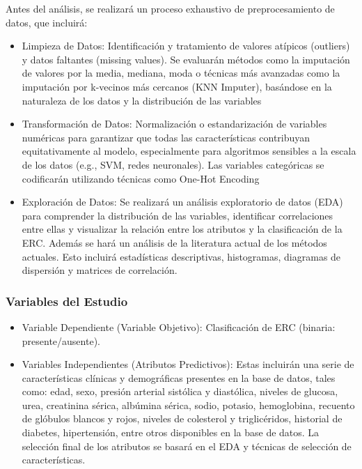 \documentclass{article}
\begin{document}
Antes del análisis, se realizará un proceso exhaustivo de
preprocesamiento de datos, que incluirá:

\begin{itemize}
    \item Limpieza de Datos: Identificación y tratamiento de
        valores atípicos (outliers) y datos faltantes
        (missing values). Se evaluarán métodos como la
        imputación de valores por la media, mediana, moda o
        técnicas más avanzadas como la imputación por
        k-vecinos más cercanos (KNN Imputer), basándose en
        la naturaleza de los datos y la distribución de las
        variables \cite{Garcia2018}
    \item Transformación de Datos: Normalización o
        estandarización de variables numéricas para
        garantizar que todas las características contribuyan
        equitativamente al modelo, especialmente para
        algoritmos sensibles a la escala de los datos (e.g.,
        SVM, redes neuronales). Las variables categóricas se
        codificarán utilizando técnicas como One-Hot
        Encoding \cite{Kuhn2013}
    \item Exploración de Datos: Se realizará un análisis
        exploratorio de datos (EDA) para comprender la
        distribución de las variables, identificar
        correlaciones entre ellas y visualizar la relación
        entre los atributos y la clasificación de la ERC.
        Además se hará un análisis de la literatura actual
        de los métodos actuales.
        Esto incluirá estadísticas descriptivas,
        histogramas, diagramas de dispersión y matrices de
        correlación.
\end{itemize}

\subsubsection{Variables del Estudio}

\begin{itemize}
    \item Variable Dependiente (Variable Objetivo):
        Clasificación de ERC (binaria: presente/ausente).

    \item Variables Independientes (Atributos Predictivos):
        Estas incluirán una serie de características
        clínicas y demográficas presentes en la base de
        datos, tales como: edad, sexo, presión arterial
        sistólica y diastólica, niveles de glucosa, urea,
        creatinina sérica, albúmina sérica, sodio, potasio,
        hemoglobina, recuento de glóbulos blancos y rojos,
        niveles de colesterol y triglicéridos, historial de
        diabetes, hipertensión, entre otros disponibles en
        la base de datos. La selección final de los
        atributos se basará en el EDA y técnicas de
        selección de características.
\end{itemize}
\end{document}
